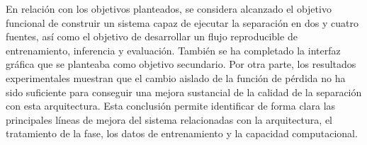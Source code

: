 En relación con los objetivos planteados, se considera alcanzado el objetivo funcional de construir un sistema capaz de ejecutar la separación en dos y cuatro fuentes, así como el objetivo de desarrollar un flujo reproducible de entrenamiento, inferencia y evaluación.
También se ha completado la interfaz gráfica que se planteaba como objetivo secundario. Por otra parte, los resultados experimentales muestran que el cambio aislado de la función de pérdida no ha sido suficiente para conseguir una mejora sustancial de la calidad de la separación con esta arquitectura. Esta conclusión permite identificar de forma clara las principales líneas de mejora del sistema relacionadas con la arquitectura, el tratamiento de la fase, los datos de entrenamiento y la capacidad computacional.
